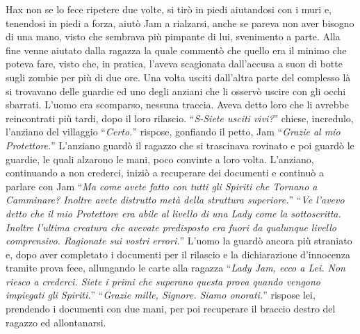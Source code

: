     Hax non se lo fece ripetere due volte, si tirò in piedi aiutandosi con
    i muri e, tenendosi in piedi a forza, aiutò Jam a rialzarsi, anche se
    pareva non aver bisogno di una mano, visto che sembrava più pimpante di 
    lui, svenimento a parte. Alla fine venne aiutato dalla ragazza la quale
    commentò che quello era il minimo che poteva fare, visto che, in
    pratica, l'aveva scagionata dall'accusa a suon di botte sugli zombie
    per più di due ore. Una volta usciti dall'altra parte del complesso là
    si trovavano delle guardie ed uno degli anziani che li osservò uscire
    con gli occhi sbarrati. L'uomo era scomparso, nessuna traccia. Aveva
    detto loro che li avrebbe reincontrati più tardi, dopo il loro
    rilascio. ``\emph{S-Siete usciti vivi?}'' chiese, incredulo, l'anziano del
    villaggio ``\emph{Certo.}'' rispose, gonfiando il petto, Jam
    ``\emph{Grazie al mio Protettore.}'' L'anziano guardò il ragazzo che
    si trascinava rovinato e poi guardò le guardie, le quali alzarono le
    mani, poco convinte a loro volta. L'anziano, continuando a non
    crederci, iniziò a recuperare dei documenti e continuò a parlare con
    Jam ``\emph{Ma come avete fatto con tutti gli Spiriti che Tornano a
    Camminare? Inoltre avete distrutto metà della struttura superiore.}''
    ``\emph{Ve l'avevo detto che il mio Protettore era abile
    al livello di una Lady come la sottoscritta. Inoltre l'ultima creatura
    che avevate predisposto era fuori da qualunque livello comprensivo.
    Ragionate sui vostri errori.}'' L'uomo la guardò ancora
    più straniato e, dopo aver completato i documenti per il rilascio e la
    dichiarazione d'innocenza tramite prova fece, allungando le carte alla
    ragazza ``\emph{\emph{Lady} Jam, ecco a Lei. Non riesco a crederci.
    Siete i primi che superano questa prova quando vengono impiegati gli
    Spiriti.}'' ``\emph{Grazie mille, Signore. Siamo onorati.}'' rispose
    lei, prendendo i documenti con due mani, per poi recuperare il braccio
    destro del ragazzo ed allontanarsi.

